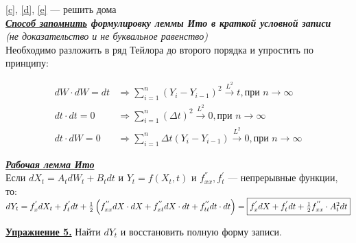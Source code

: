 \documentclass[a4paper]{article}
\begin{document}
 \ref{c}, \ref{d}, \ref{e} --- решить дома\\

{\large\it {\bf\underline{Способ запомнить} формулировку леммы Ито в краткой условной записи} \\
(не доказательство и не буквальное равенство)} \\

Необходимо разложить в ряд Тейлора до второго порядка и упростить по принципу:

\begin{align*}
dW\cdot dW = dt & \Rightarrow \sum_{i=1}^{n}(Y_i-Y_{i-1})^2 \xrightarrow{L^2} t, \text{при } n\rightarrow\infty\\
dt\cdot dt = 0 & \Rightarrow \sum_{i=1}^{n}(\Delta t)^2 \xrightarrow{L^2} 0, \text{при } n\rightarrow\infty\\
dt\cdot dW = 0 & \Rightarrow \sum_{i=1}^{n}\Delta t(Y_i-Y_{i-1}) \xrightarrow{L^2} 0, \text{при } n\rightarrow\infty
\end{align*}

 {\large\it\bf \underline{Рабочая лемма Ито}}\\

 Если $dX_t=A_tdW_t+B_tdt$ и $Y_t=f(X_t,t)$ и $f^{''}_{xx}, f^{'}_{t}$ --- непрерывные функции, то:\\

 $dY_t=f^{'}_{x}dX_t+f^{'}_tdt+\frac{1}{2}\left(f^{''}_{xx}dX\cdot dX+f^{''}_{xt}dX\cdot dt+f^{''}_{tt}dt\cdot dt\right)=\fbox{$f^{'}_xdX+f^{'}_tdt+\frac{1}{2}f^{''}_{xx}\cdot A^{2}_{t}dt$}$\\

\par {\bf\underline{Упражнение 5.}} Найти $dY_t$ и восстановить полную форму записи.
\end{document}
